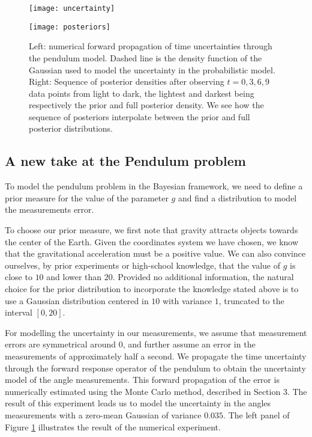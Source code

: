 \begin{figure}[t!]
  \begin{minipage}{.5\textwidth}
    \texttt{[image: uncertainty]}
  \end{minipage}
  \begin{minipage}{.5\textwidth}
    \texttt{[image: posteriors]}
  \end{minipage}
  \caption{Left: numerical forward propagation of time uncertainties through the pendulum model. Dashed line is the density function of the Gaussian used to model the uncertainty in the probabilistic model. Right: Sequence of posterior densities after observing $t=0, 3, 6, 9$ data points from light to dark, the lightest and darkest being respectively the prior and full posterior density. We see how the sequence of posteriors interpolate between the prior and full posterior distributions. }
  \label{uncertainty-posteriors}
\end{figure}


\subsection{A new take at the Pendulum problem}

To model the pendulum problem in the Bayesian framework, we need to define a prior measure for the value of the parameter $g$ and find a distribution to model the measurements error.

To choose our prior measure, we first note that gravity attracts objects towards the center of the Earth. Given the coordinates system we have chosen, we know that the gravitational acceleration must be a positive value. We can also convince ourselves, by prior experiments or high-school knowledge, that the value of $g$ is close to $10$ and lower than $20$. Provided no additional information, the natural choice for the prior distribution to incorporate the knowledge stated above is to use a Gaussian distribution centered in $10$ with variance $1$, truncated to the interval $[0, 20]$.

For modelling the uncertainty in our measurements, we assume that measurement errors are symmetrical around $0$, and further assume an error in the measurements of approximately half a second. We propagate the time uncertainty through the forward response operator of the pendulum to obtain the uncertainty model of the angle measurements. This forward propagation of the error is numerically estimated using the Monte Carlo method, described in Section 3. The result of this experiment leads us to model the uncertainty in the angles measurements with a zero-mean Gaussian of variance $0.035$. The left panel of Figure \ref{uncertainty-posteriors} illustrates the result of the numerical experiment.

